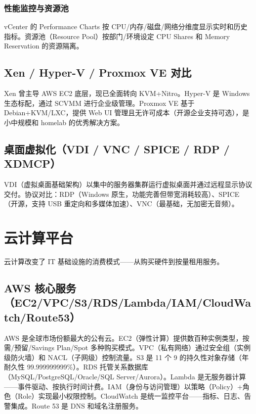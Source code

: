 \documentclass[12pt,UTF8]{ctexbook}
\begin{document}
    \subsection{性能监控与资源池}

vCenter 的 Performance Charts 按 CPU/内存/磁盘/网络分维度显示实时和历史指标。资源池（Resource Pool）按部门/环境设定 CPU Shares 和 Memory Reservation 的资源隔离。

  \section{Xen / Hyper-V / Proxmox VE 对比}

Xen 曾主导 AWS EC2 底层，现已全面转向 KVM+Nitro。Hyper-V 是 Windows 生态标配，通过 SCVMM 进行企业级管理。Proxmox VE 基于 Debian+KVM/LXC，提供 Web UI 管理且无许可成本（开源企业支持可选），是小中规模和 homelab 的优秀解决方案。

  \section{桌面虚拟化（VDI / VNC / SPICE / RDP / XDMCP）}

VDI（虚拟桌面基础架构）以集中的服务器集群运行虚拟桌面并通过远程显示协议交付。协议对比：RDP（Windows 原生，功能完善但带宽消耗较高）、SPICE（开源，支持 USB 重定向和多媒体加速）、VNC（最基础，无加密无音频）。

\chapter{云计算平台}
\label{chap:cloud-platforms}

云计算改变了 IT 基础设施的消费模式——从购买硬件到按量租用服务。

  \section{AWS 核心服务（EC2/VPC/S3/RDS/Lambda/IAM/CloudWatch/Route53）}

AWS 是全球市场份额最大的公有云。EC2（弹性计算）提供数百种实例类型，按需/预留/Savings Plan/Spot 多种购买模式。VPC（私有网络）通过安全组（实例级防火墙）和 NACL（子网级）控制流量。S3 是 11 个 9 的持久性对象存储（年耐久性 99.999999999\%）。RDS 托管关系数据库（MySQL/PostgreSQL/Oracle/SQL Server/Aurora）。Lambda 是无服务器计算——事件驱动、按执行时间计费。IAM（身份与访问管理）以策略（Policy）+角色（Role）实现最小权限控制。CloudWatch 是统一监控平台——指标、日志、告警集成。Route 53 是 DNS 和域名注册服务。
\end{document}
